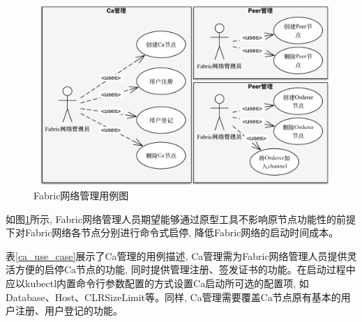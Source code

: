 \begin{figure}[!htbp] %
    \centering %
    \includegraphics[width=1.0\textwidth]{FIGs/chapter4/fabric_use_case.pdf} %
    \caption{Fabric网络管理用例图} %
    \label{fabric_use_case} %
\end{figure}%


如图\ref{fabric_use_case}所示, Fabric网络管理人员期望能够通过原型工具不影响原节点功能性的前提下对Fabric网络各节点分别进行命令式启停, 降低Fabric网络的启动时间成本。



表\ref{ca_use_case}展示了Ca管理的用例描述, Ca管理需为Fabric网络管理人员提供灵活方便的启停Ca节点的功能, 同时提供管理注册、签发证书的功能。在启动过程中应以kubectl内置命令行参数配置的方式设置Ca启动所可选的配置项, 如Database、Host、CLRSizeLimit等。同样, Ca管理需要覆盖Ca节点原有基本的用户注册、用户登记的功能。

